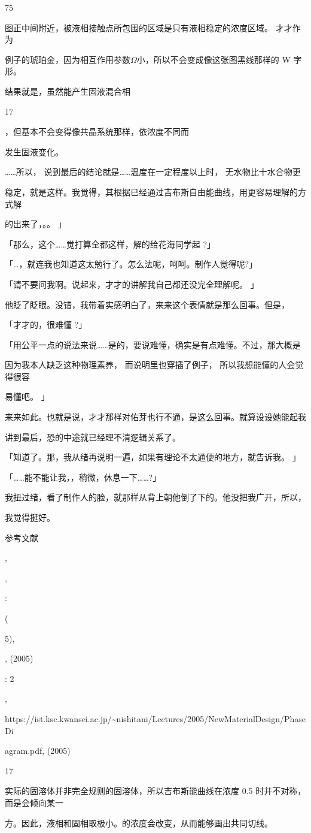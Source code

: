 75\par
图正中间附近，被液相接触点所包围的区域是只有液相稳定的浓度区域。 才才作为\par
例子的琥珀金，因为相互作用参数$\Omega$小，所以不会变成像这张图黑线那样的 W 字形。\par
结果就是，虽然能产生固液混合相\par
17\par
，但基本不会变得像共晶系统那样，依浓度不同而\par
发生固液变化。\par
……所以， 说到最后的结论就是……温度在一定程度以上时， 无水物比十水合物更\par
稳定，就是这样。我觉得，其根据已经通过吉布斯自由能曲线，用更容易理解的方式解\par
的出来了，。。 」\par
「那么，这个……觉打算全都这样，解的给花海同学起 ?」\par
「…，就连我也知道这太勉行了。怎么法呢，呵呵。制作人觉得呢?」\par
「请不要问我啊。说起来，才才的讲解我自己都还没完全理解呢。 」\par
他眨了眨眼。没错，我带着实感明白了，来来这个表情就是那么回事。但是，\par
「才才的，很难懂 ?」\par
「用公平一点的说法来说……是的，要说难懂，确实是有点难懂。不过，那大概是\par
因为我本人缺乏这种物理素养， 而说明里也穿插了例子， 所以我想能懂的人会觉得很容\par
易懂吧。 」\par
来来如此。也就是说，才才那样对佑芽也行不通，是这么回事。就算设设她能起我\par
讲到最后，恐的中途就已经理不清逻辑关系了。\par
「知道了。那，我从绪再说明一遍，如果有理论不太通便的地方，就告诉我。 」\par
「……能不能让我，，稍微，休息一下……?」\par
我扭过绪，看了制作人的脸，就那样从背上朝他倒了下的。他没把我广开，所以，\par
我觉得挺好。\par
参考文献\par
[1]\par
,\par
,\par
:\par
(\par
5),\par
, (2005)\par
[2]\par
: 2\par
,\par
https://ist.ksc.kwansei.ac.jp/\textasciitilde{}nishitani/Lectures/2005/NewMaterialDesign/PhaseDi\par
agram.pdf, (2005)\par
17\par
实际的固溶体并非完全规则的固溶体，所以吉布斯能曲线在浓度 0.5 时并不对称，而是会倾向某一\par
方。因此，液相和固相取极小。的浓度会改变，从而能够画出共同切线。\par


